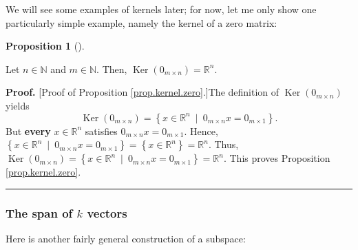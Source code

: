 \documentclass[numbers=enddot,12pt,final,onecolumn,notitlepage]{scrartcl}%
\theoremstyle{definition}
\newtheorem{prop}[theo]{Proposition}
\newenvironment{proposition}[1][]
{\begin{prop}[#1]\begin{leftbar}}
{\end{leftbar}\end{prop}}
\newenvironment{proof}[1][Proof]{\noindent\textbf{#1.} }{\ \rule{0.5em}{0.5em}}
\begin{document}
We will see some examples of kernels later; for now, let me only show one
particularly simple example, namely the kernel of a zero matrix:

\begin{proposition}
\label{prop.kernel.zero}Let $n\in\mathbb{N}$ and $m\in\mathbb{N}$. Then,
$\operatorname*{Ker}\left(  0_{m\times n}\right)  =\mathbb{R}^{n}$.
\end{proposition}

\begin{proof}
[Proof of Proposition \ref{prop.kernel.zero}.]The definition of
$\operatorname*{Ker}\left(  0_{m\times n}\right)  $ yields
\[
\operatorname*{Ker}\left(  0_{m\times n}\right)  =\left\{  x\in\mathbb{R}%
^{n}\ \mid\ 0_{m\times n}x=0_{m\times1}\right\}  .
\]
But \textbf{every} $x\in\mathbb{R}^{n}$ satisfies $0_{m\times n}x=0_{m\times
1}$. Hence, $\left\{  x\in\mathbb{R}^{n}\ \mid\ 0_{m\times n}x=0_{m\times
1}\right\}  =\left\{  x\in\mathbb{R}^{n}\right\}  =\mathbb{R}^{n}$. Thus,
$\operatorname*{Ker}\left(  0_{m\times n}\right)  =\left\{  x\in\mathbb{R}%
^{n}\ \mid\ 0_{m\times n}x=0_{m\times1}\right\}  =\mathbb{R}^{n}$. This proves
Proposition \ref{prop.kernel.zero}.
\end{proof}

\subsubsection{The span of $k$ vectors}

Here is another fairly general construction of a subspace:
\end{document}

